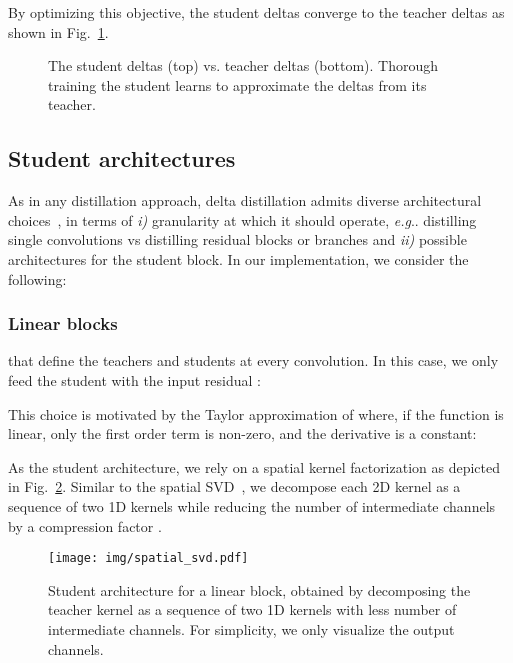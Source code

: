 \documentclass[runningheads]{llncs}
\makeatletter
\DeclareRobustCommand\onedot{\futurelet\@let@token\@onedot}
\def\@onedot{\ifx\@let@token.\else.\null\fi\xspace}
\def\eg{\emph{e.g}\onedot} \def\Eg{\emph{E.g}\onedot}
\makeatother
\begin{document}
By optimizing this objective, the student deltas  converge to the teacher deltas  as shown in Fig.~\ref{fig:deltas}.\\
\bgroup
\setlength{\tabcolsep}{1.5pt}
\begin{figure}[t]
\centering
{}
\caption{The student deltas  (top) vs. teacher deltas  (bottom). Thorough training the student learns to approximate the deltas from its teacher.}
\vspace{-4mm}
\label{fig:deltas}
\end{figure}
\egroup \subsection{Student architectures}\label{sec:student_architectures}
As in any distillation approach, delta distillation admits diverse architectural choices~\cite{distillationsurvey}, in terms of \textit{i)} granularity at which it should operate, \eg distilling single convolutions vs distilling residual blocks or branches and \textit{ii)} possible architectures for the student block.
In our implementation, we consider the following:
\subsubsection{Linear blocks} that define the teachers and students at every convolution. In this case, we only feed the student with the input residual :

This choice is motivated by the Taylor approximation of  where, if the function  is linear, only the first order term is non-zero, and the derivative  is a constant:


As the student architecture, we rely on a spatial kernel factorization as depicted in Fig.~\ref{fig:svd_like}. Similar to the spatial SVD~\cite{spatial_svd}, we decompose each 2D kernel as a sequence of two 1D kernels while reducing the number of intermediate channels by a compression factor .
\begin{figure}[t!]
\centering
\texttt{[image: img/spatial\_svd.pdf]}
\vspace{-2mm}
\caption{Student architecture for a linear block, obtained by decomposing the teacher kernel as a sequence of two 1D kernels with  less number of intermediate channels. For simplicity, we only visualize the output channels.
}
\vspace{-4mm}
\label{fig:svd_like}
\end{figure} 
\end{document}
